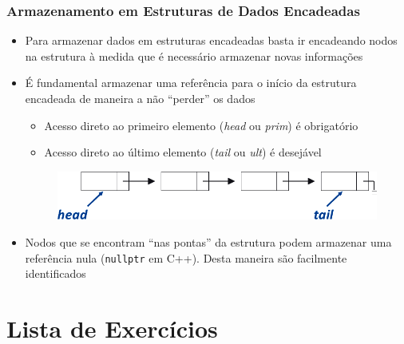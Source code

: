 \documentclass[aspectratio=169]{beamer}
\begin{document}
\begin{frame}\frametitle{Armazenamento em Estruturas de Dados Encadeadas}
\begin{itemize}
	\item Para armazenar dados em estruturas encadeadas basta ir encadeando nodos na estrutura à medida que é necessário armazenar novas informações
	\item É fundamental armazenar uma referência para o início da estrutura encadeada de maneira a não ``perder'' os dados
	\begin{itemize}
		\item Acesso direto ao primeiro elemento (\emph{head} ou \emph{prim}) é obrigatório
		\item Acesso direto ao último elemento (\emph{tail} ou \emph{ult}) é desejável
	\end{itemize}
\begin{figure}[h]
	\includegraphics[height=0.15\paperheight]{pucrs-ec-poo-unidade_12-estruturas_encadeadas-laminas-estrutura_encadeada_07.png}
\end{figure}
	\item Nodos que se encontram ``nas pontas'' da estrutura podem armazenar uma referência nula (\texttt{nullptr} em C++). Desta maneira são facilmente identificados
\end{itemize}
\end{frame}

\section{Lista de Exercícios}
\end{document}
